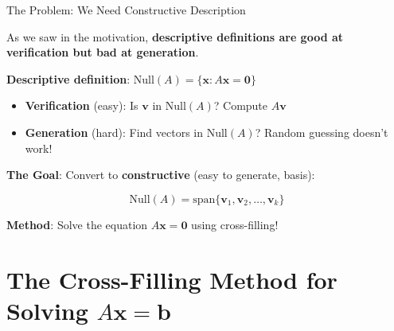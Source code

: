 \documentclass[10pt]{beamer}
\theoremstyle{definition}
\newcommand{\x}[1]{\alert{\textbf{#1}}}
\begin{document}
\begin{frame}{The Problem: We Need Constructive Description}

As we saw in the motivation, \x{descriptive definitions are good at verification but bad at generation}.

\vspace{1em}

\x{Descriptive definition}: $\text{Null}(A) = \{\mathbf{x} : A\mathbf{x} = \mathbf{0}\}$

\begin{itemize}
\item \textbf{Verification} (easy): Is $\mathbf{v}$ in $\text{Null}(A)$? Compute $A\mathbf{v}$
\item \textbf{Generation} (hard): Find vectors in $\text{Null}(A)$? Random guessing doesn't work!
\end{itemize}

\vspace{1em}

\x{The Goal}: Convert to \textbf{constructive} (easy to generate, basis):

$$\text{Null}(A) = \text{span}\{\mathbf{v}_1, \mathbf{v}_2, \ldots, \mathbf{v}_k\}$$

\vspace{0.5em}

\x{Method}: Solve the equation $A\mathbf{x} = \mathbf{0}$ using cross-filling!

\end{frame}

\section{The Cross-Filling Method for Solving $A\mathbf{x} = \mathbf{b}$}
\end{document}
